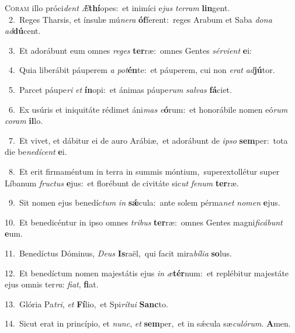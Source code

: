 \lettrine{\initial\textcolor{\initialcolor}{C}}{oram} illo próci\textit{dent} \textit{Æ}\-\textbf{thí}opes:~\star et inimíci e\textit{jus} \textit{ter}\-\textit{ram} \textbf{lin}\-gent.\\
{\numbfont\textcolor{\numbcolor}{~2.}}~Reges Tharsis, et ínsulæ mú\-\textit{ne}\-\textit{ra} \textbf{óf}\-ferent:~\star reges Arabum et Saba \textit{do}\-\textit{na} \textit{ad}\-\textbf{dú}cent.\par
{\numbfont\textcolor{\numbcolor}{~3.}}~Et adorábunt eum omnes \textit{re}\-\textit{ges} \textbf{ter}\-ræ:~\star omnes Gentes \textit{sér}\-\textit{vi}\textit{ent} \textbf{e}\-i:\par
{\numbfont\textcolor{\numbcolor}{~4.}}~Quia liberábit páuperem \textit{a} \textit{pot}\-\textbf{én}te:~\star et páuperem, cui non \textit{e}\-\textit{rat} \textit{ad}\-\textbf{jú}tor.\par
{\numbfont\textcolor{\numbcolor}{~5.}}~Parcet páupe\textit{ri} \textit{et} \textbf{ín}\-opi:~\star et ánimas páupe\textit{rum} \textit{sal}\-\textit{vas} \textbf{fá}\-ciet.\par
{\numbfont\textcolor{\numbcolor}{~6.}}~Ex usúris et iniquitáte rédimet áni\textit{mas} \textit{e}\-\textbf{ó}rum:~\star et honorábile nomen eó\textit{rum} \textit{co}\-\textit{ram} \textbf{il}\-lo.\par
{\numbfont\textcolor{\numbcolor}{~7.}}~Et vivet, et dábitur ei de auro Arábiæ,~\dagger et adorábunt de \textit{ip}\-\textit{so} \textbf{sem}\-per:~\star tota die be\-\textit{ne}\-\textit{dí}\textit{cent} \textbf{e}\-i.\par
{\numbfont\textcolor{\numbcolor}{~8.}}~Et erit firmaméntum in terra in summis móntium,~\dagger superextollétur super Líbanum \textit{fruc}\-\textit{tus} \textbf{e}\-jus:~\star et florébunt de civitáte sic\textit{ut} \textit{fe}\-\textit{num} \textbf{ter}\-ræ.\par
{\numbfont\textcolor{\numbcolor}{~9.}}~Sit nomen ejus benedíc\textit{tum} \textit{in} \textbf{sǽ}\-cula:~\star ante solem pérma\textit{net} \textit{no}\-\textit{men} \textbf{e}\-jus.\par
{\numbfont\textcolor{\numbcolor}{10.}}~Et benedicéntur in ipso omnes \textit{tri}\-\textit{bus} \textbf{ter}\-ræ:~\star omnes Gentes magni\-\textit{fi}\-\textit{cá}\textit{bunt} \textbf{e}\-um.\par
{\numbfont\textcolor{\numbcolor}{11.}}~Benedíctus Dóminus, \textit{De}\-\textit{us} \textbf{Is}\-raël,~\star qui facit mira\-\textit{bí}\-\textit{li}\textit{a} \textbf{so}\-lus.\par
{\numbfont\textcolor{\numbcolor}{12.}}~Et benedíctum nomen majestátis ejus \textit{in} \textit{æ}\-\textbf{tér}num:~\star et replébitur majestáte ejus omnis ter\-\textit{ra}\-: \textit{fi}\-\textit{at}, \textbf{fi}\-at.\par
{\numbfont\textcolor{\numbcolor}{13.}}~Glória Pa\-\textit{tri}\-, \textit{et} \textbf{Fí}\-lio,~\star et Spi\-\textit{rí}\-\textit{tu}\textit{i} \textbf{Sanc}\-to.\par
{\numbfont\textcolor{\numbcolor}{14.}}~Sicut erat in princípio, et \textit{nunc}\-, \textit{et} \textbf{sem}\-per,~\star et in sǽcula sæ\-\textit{cu}\-\textit{ló}\textit{rum}. \textbf{A}\-men.\par
